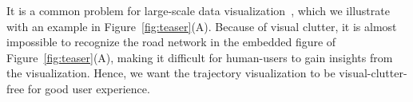  It is a common problem for large-scale data visualization~\cite{clutter}, which we illustrate with an example in Figure~\ref{fig:teaser}(A). Because of visual clutter, it is almost impossible to recognize the road network in the embedded figure of Figure~\ref{fig:teaser}(A), making it difficult for human-users to gain insights from the visualization. Hence, we want the trajectory visualization to be visual-clutter-free for good user experience.

%




